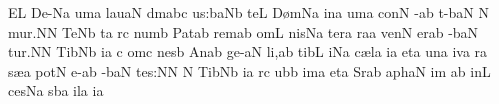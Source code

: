 

\def\holyScandicus{\pes Na\rlap{\augmentum N}\nonspatium\quilismapes bc}

\Internote
{}
\initiumgregorianum
{}%
\sgn {}E{}\punctum L\egn
\spatium
\sgn De-\pes Na\egn
\sgn {}um\punctum a\egn
\spatium
\sgn lau\clivis aN\egn
\sgn d{\a}m\quilismascandicus abc\egn
\sgn {}u{s:}\clivis ba\augmentumduplex Nb\egn
\spatium
\Asteriscus
\divisiominor
\spatium
\sgn te{}\punctum L\egn
\spatium
\sgn D{\o}m\pes Na\egn
\sgn {}in\punctum a\egn
\sgn {}um\punctum a\egn
\spatium
\sgn con\punctum N\egn
{}-\pes ab\egn
\sgn t{\e}-\climacus baN\egn
\spatium\custos N\lineaproxima
\sgn mu{r.}\punctum N\augmentum N\egn
\spatium\divisiofinalis\spatium
\sgn Te{}\pes Nb\egn
\spatium
\sgn {}{\ae}t\punctum a\egn
\sgn {}{\e}r\punctum c\egn
\sgn num\punctum b\egn
\spatium
\sgn Pat\pes ab\egn
\sgn rem\punctum a\augmentum b\egn
\spatium
\divisiominor
\spatium
\sgn {}om\punctum L\egn
\sgn nis\pes Na\egn
\spatium
\sgn ter\punctum a\egn
\sgn ra{}\punctum a\egn
\spatium
\sgn ven\punctum N\egn
\sgn {}er\pes ab\egn
\sgn {}{\a}-\climacus baN\egn
\sgn tu{r.}\punctum N\augmentum N\egn
\spatium\divisiofinalis\spatium
\sgn Tib\pes Nb\egn
\sgn {}i{}\punctum a\egn
\spatium\custos c\lineaproxima
\sgn {}om\punctum c\egn
\sgn nes\punctum b\egn
\spatium
\sgn {}An\pes ab\egn
\sgn ge-\clivis aN\egn
\sgn li,\punctum a\augmentum b\egn
\spatium
\divisiominor
\spatium
\sgn tib\punctum L\egn
\sgn {}i{}\pes Na\egn
\spatium
\sgn c{\ae}l\punctum a\egn
\sgn {}i{}\punctum a\egn
\spatium
\sgn {}et\punctum a\egn
\spatium
\sgn {}un\punctum a\egn
\sgn {}iv\punctum a\egn
\sgn {}{\e}r\punctum a\egn
\sgn s{\ae}{}\punctum a\egn
\spatium
\sgn pot\punctum N\egn
\sgn {}e-\pes ab\egn
{}-\climacus baN\egn
\sgn te{s:}\punctum N\augmentum N\egn
\spatium
\divisiofinalis
\spatium\custos N\lineaproxima
\sgn Tib\pes Nb\egn
\sgn {}i{}\punctum a\egn
\spatium
{}r\punctum c\egn
\sgn {}ub\punctum b\egn
\sgn {}im\punctum a\egn
\spatium
\sgn {}et\punctum a\egn
\spatium
\sgn S{\e}r\pes ab\egn
\sgn {}a{ph}\clivis aN\egn
\sgn {}im%
\punctum a\augmentum b\egn
\spatium\divisiominor\spatium
\sgn {}in\punctum L\egn
\sgn ces\pes Na\egn
\sgn s{\a}b\punctum a\egn
\sgn {}il\punctum a\egn
\sgn {}i{}\punctum a\egn
